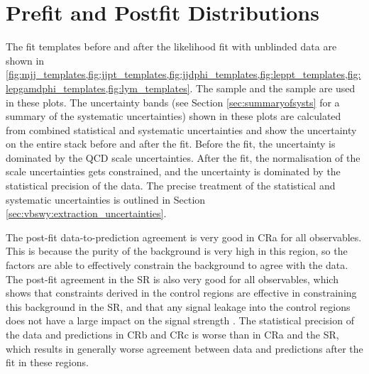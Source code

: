 
\clearpage
\section{Prefit and Postfit Distributions}
\label{sec:input_sims}

The fit templates before and after the likelihood fit with unblinded data are shown in \cref{fig:mjj_templates,fig:jjpt_templates,fig:jjdphi_templates,fig:leppt_templates,fig:lepgamdphi_templates,fig:lym_templates}. The \SHERPA \ewwy sample and the \SHERPA \qcdwy sample are used in these plots. The uncertainty bands (see Section \ref{sec:summaryofsysts} for a summary of the systematic uncertainties) shown in these plots are calculated from combined statistical and systematic uncertainties and show the uncertainty on the entire stack before and after the fit. Before the fit, the uncertainty is dominated by the QCD scale uncertainties. After the fit, the normalisation of the scale uncertainties gets constrained, and the uncertainty is dominated by the statistical precision of the data. The precise treatment of the statistical and systematic uncertainties is outlined in Section \ref{sec:vbswy:extraction_uncertainties}. 

The post-fit data-to-prediction agreement is very good in CRa for all observables. This is because the purity of the background is very high in this region, so the \bl factors are able to effectively constrain the background to agree with the data. The post-fit agreement in the SR is also very good for all observables, which shows that \qcdwy constraints derived in the control regions are effective in constraining this background in the SR, and that any signal leakage into the control regions does not have a large impact on the signal strength \muew. The statistical precision of the data and predictions in CRb and CRc is worse than in CRa and the SR, which results in generally worse agreement between data and predictions after the fit in these regions.

